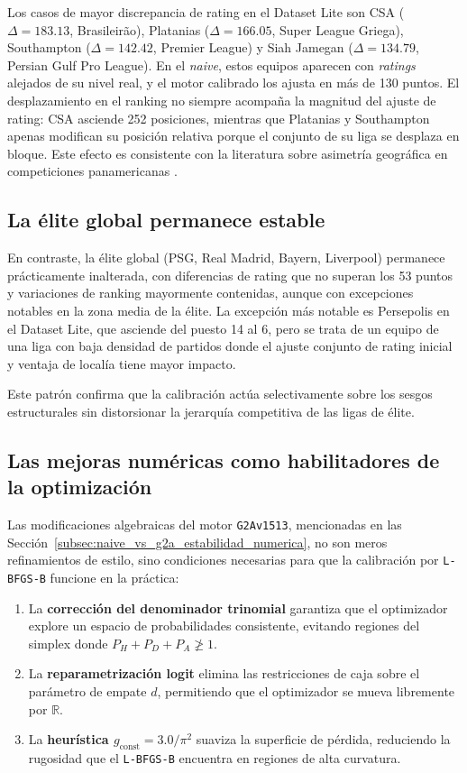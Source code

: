 Los casos de mayor discrepancia de rating en el Dataset Lite son CSA ($\Delta=183.13$, Brasileir\~ao), Platanias ($\Delta=166.05$, Super League Griega), Southampton ($\Delta=142.42$, Premier League) y Siah Jamegan ($\Delta=134.79$, Persian Gulf Pro League). En el \textit{naive}, estos equipos aparecen con \textit{ratings} alejados de su nivel real, y el motor calibrado los ajusta en m\'as de 130 puntos. El desplazamiento en el ranking no siempre acompa\~na la magnitud del ajuste de rating: CSA asciende 252 posiciones, mientras que Platanias y Southampton apenas modifican su posici\'on relativa porque el conjunto de su liga se desplaza en bloque. Este efecto es consistente con la literatura sobre asimetr\'ia geogr\'afica en competiciones panamericanas \cite{Iskandaryan2020}.

\subsection{La \'elite global permanece estable}

En contraste, la \'elite global (PSG, Real Madrid, Bayern, Liverpool) permanece pr\'acticamente inalterada, con diferencias de rating que no superan los 53 puntos y variaciones de ranking mayormente contenidas, aunque con excepciones notables en la zona media de la élite. La excepci\'on m\'as notable es Persepolis en el Dataset Lite, que asciende del puesto 14 al 6, pero se trata de un equipo de una liga con baja densidad de partidos donde el ajuste conjunto de rating inicial y ventaja de local\'ia tiene mayor impacto.

Este patr\'on confirma que la calibraci\'on act\'ua selectivamente sobre los sesgos estructurales sin distorsionar la jerarqu\'ia competitiva de las ligas de \'elite.

\subsection{Las mejoras num\'ericas como habilitadores de la optimizaci\'on}

Las modificaciones algebraicas del motor \texttt{G2Av1513}, mencionadas en las Secci\'on~\ref{subsec:naive_vs_g2a_estabilidad_numerica}, no son meros refinamientos de estilo, sino condiciones necesarias para que la calibraci\'on por \texttt{L-BFGS-B} funcione en la pr\'actica:
\begin{enumerate}
	\item La \textbf{correcci\'on del denominador trinomial} garantiza que el optimizador explore un espacio de probabilidades consistente, evitando regiones del simplex donde $P_H + P_D + P_A \ngeq 1$.
	\item La \textbf{reparametrizaci\'on logit} elimina las restricciones de caja sobre el par\'ametro de empate $d$, permitiendo que el optimizador se mueva libremente por $\mathbb{R}$.
	\item La \textbf{heur\'istica $g_{\text{const}} = 3.0/\pi^2$} suaviza la superficie de p\'erdida, reduciendo la rugosidad que el \texttt{L-BFGS-B} encuentra en regiones de alta curvatura.
\end{enumerate}


